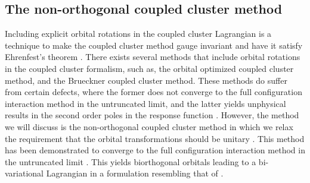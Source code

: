        \subsection{The non-orthogonal coupled cluster method}
            \label{subsec:nocc}
            Including explicit orbital rotations in the coupled cluster
            Lagrangian is a technique to make the coupled cluster method gauge
            invariant \cite{gauge-invariant-thomas, gauge-invariant-thomas-2}
            and have it satisfy Ehrenfest's theorem \cite{rolf-nocc}.
            There exists several methods that include orbital rotations in the
            coupled cluster formalism, such as, the orbital optimized coupled
            cluster method, and the Brueckner coupled cluster method.
            These methods do suffer from certain defects, where the former does
            not converge to the full configuration interaction method in the
            untruncated limit, and the latter yields unphysical results in the
            second order poles in the response function \cite{rolf-nocc}.
            However, the method we will discuss is the non-orthogonal coupled
            cluster method \cite{gauge-invariant-thomas-2} in which we relax the
            requirement that the orbital transformations should be unitary
            \cite{rolf-nocc}.
            This method has been demonstrated to converge to the full
            configuration interaction method in the untruncated limit
            \cite{rolf-nocc}.
            This yields biorthogonal orbitals leading to a bi-variational
            Lagrangian \cite{kvaal2013variational} in a formulation resembling
            that of \citeauthor{arponen1983311} \cite{arponen1983311}.

